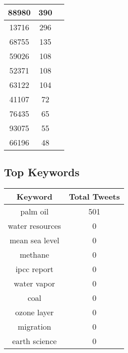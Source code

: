 \documentclass{article}\usepackage[T1]{fontenc}
\begin{document}
\begin{tabular}{|c|c|c|}
 \hline
88980 & 390\\ 
 \hline
13716 & 296\\ 
 \hline
68755 & 135\\ 
 \hline
59026 & 108\\ 
 \hline
52371 & 108\\ 
 \hline
63122 & 104\\ 
 \hline
41107 & 72\\ 
 \hline
76435 & 65\\ 
 \hline
93075 & 55\\ 
 \hline
66196 & 48\\ 
 \hline
\end{tabular}\subsection*{Top Keywords}\begin{tabular}{|c|c|}         \hline         Keyword & Total Tweets \\ 
 \hline
palm oil & 501\\ 
 \hline
water resources & 0\\ 
 \hline
mean sea level & 0\\ 
 \hline
methane & 0\\ 
 \hline
ipcc report & 0\\ 
 \hline
water vapor & 0\\ 
 \hline
coal & 0\\ 
 \hline
ozone layer & 0\\ 
 \hline
migration & 0\\ 
 \hline
earth science & 0\\ 
 \hline
\end{tabular}
\end{document}
